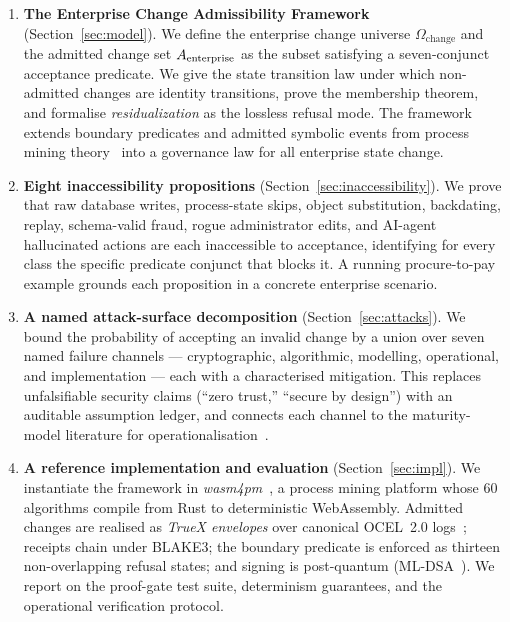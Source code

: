 \begin{enumerate}[label=(\arabic*),leftmargin=2em]
  \item \textbf{The Enterprise Change Admissibility Framework}
        (Section~\ref{sec:model}). We define the enterprise change universe
        $\Omega_{\mathrm{change}}$ and the admitted change set $A_{\mathrm{enterprise}}$ as the
        subset satisfying a seven-conjunct acceptance predicate. We give the
        state transition law under which non-admitted changes are identity
        transitions, prove the membership theorem, and formalise
        \emph{residualization} as the lossless refusal mode. The framework
        extends boundary predicates and admitted symbolic events from process
        mining theory~\cite{van_der_aalst_2016_process_mining,van_der_aalst_berti_2020}
        into a governance law for all enterprise state change.
  \item \textbf{Eight inaccessibility propositions}
        (Section~\ref{sec:inaccessibility}). We prove that raw database writes,
        process-state skips, object substitution, backdating, replay,
        schema-valid fraud, rogue administrator edits, and AI-agent hallucinated
        actions are each inaccessible to acceptance, identifying for every class
        the specific predicate conjunct that blocks it. A running
        procure-to-pay example grounds each proposition in a concrete enterprise
        scenario.
  \item \textbf{A named attack-surface decomposition}
        (Section~\ref{sec:attacks}). We bound the probability of accepting an
        invalid change by a union over seven named failure channels ---
        cryptographic, algorithmic, modelling, operational, and
        implementation --- each with a characterised mitigation. This replaces
        unfalsifiable security claims (``zero trust,'' ``secure by design'')
        with an auditable assumption ledger, and connects each channel to the
        maturity-model literature for
        operationalisation~\cite{sok_ccmm_2024,crypto_agility_maturity_2022}.
  \item \textbf{A reference implementation and evaluation}
        (Section~\ref{sec:impl}). We instantiate the framework in
        \emph{wasm4pm}~\cite{chatman_wasm4pm_2026}, a process mining platform
        whose 60 algorithms compile from Rust to deterministic WebAssembly.
        Admitted changes are realised as \emph{TrueX envelopes} over canonical
        OCEL~2.0 logs~\cite{berti_et_al_ocel2_spec_2024}; receipts chain under
        BLAKE3; the boundary predicate is enforced as thirteen non-overlapping
        refusal states; and signing is post-quantum
        (ML-DSA~\cite{nist_fips_204_2024}). We report on the proof-gate test
        suite, determinism guarantees, and the operational verification
        protocol.
\end{enumerate}

